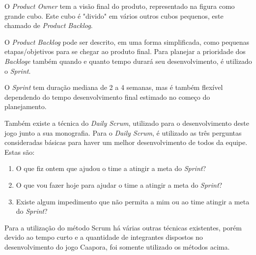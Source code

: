 	\begin{figure}[h!]
		\centering
	\end{figure}
	
O \textit{Product Owner} tem a visão final do produto, representado na figura como grande cubo. Este cubo é "divido" em vários outros cubos pequenos, este chamado de \textit{Product Backlog}.

O \textit{Product Backlog} pode ser descrito, em uma forma simplificada, como pequenas etapas/objetivos para se chegar ao produto final.
Para planejar a prioridade dos \textit{Backloge} também quando e quanto tempo durará seu desenvolvimento, é utilizado o \textit{Sprint}.

O \textit{Sprint} tem duração mediana de 2 a 4 semanas, mas é também flexível dependendo do tempo desenvolvimento final estimado no começo do planejamento.

Também existe a técnica do \textit{Daily Scrum}, utilizado para o desenvolvimento deste jogo junto a sua monografia. Para o \textit{Daily Scrum}, é utilizado as três perguntas consideradas básicas para haver um melhor desenvolvimento de todos da equipe.
Estas são:

\begin{enumerate}
   \item O que fiz ontem que ajudou o time a atingir a meta do \textit{Sprint}?
   \item O que vou fazer hoje para ajudar o time a atingir a meta do \textit{Sprint}?
   \item  Existe algum impedimento que não permita a mim ou ao time atingir a meta do \textit{Sprint}?
 \end{enumerate}
 
Para a utilização do método Scrum há várias outras técnicas existentes, porém devido ao tempo curto e a quantidade de integrantes dispostos no desenvolvimento do jogo Caapora, foi somente utilizado os métodos acima.


